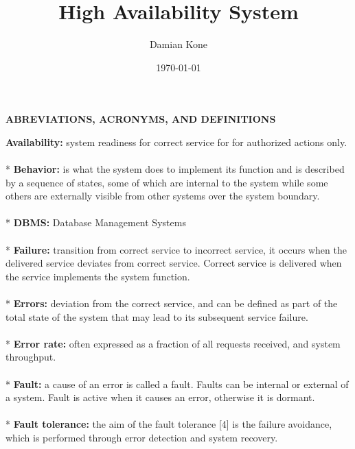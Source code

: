 \documentclass[english]{tktltiki2}
\title{High Availability System}
\author{Damian Kone}
\date{\today}
\theoremstyle{definition}
\theoremstyle{remark}
\begin{document}

\frontmatter      %

\maketitle        %
\makeabstract     %

\tableofcontents  %


\mainmatter       %




\begin{center} 
\textbf{ABREVIATIONS, ACRONYMS, AND DEFINITIONS} \cite{Avizienis2004BasicCA, AAMES, article1}
\end{center}
\textbf{Availability:} system readiness for correct service for  for authorized actions only.\\ \\*
\textbf{Behavior:} is what the system does to implement its function
and is described by a sequence of states, some of which are internal to the
system while some others are externally visible from other systems over
the system boundary.\\ \\*
\textbf{DBMS:} Database Management Systems\\ \\*
\textbf{Failure:} transition from correct service to incorrect service, it
occurs when the delivered service deviates from correct service. Correct service is delivered when the service implements the system function.\\
\\*
\textbf{Errors:} deviation from the correct service, and can be defined as part of the total state of the system that may lead to its subsequent service failure.\\
\\*
\textbf{Error rate:} often expressed as a fraction of all requests received, and system throughput.\\
\\*
\textbf{Fault:} a cause of an error is called a fault. Faults can be internal or external of a system. Fault is active when it causes an error, otherwise it is dormant.\\
\\*
\textbf{Fault tolerance:} the aim of the fault tolerance [4] is the failure avoidance, which is performed through error detection and system recovery.\\
\end{document}
